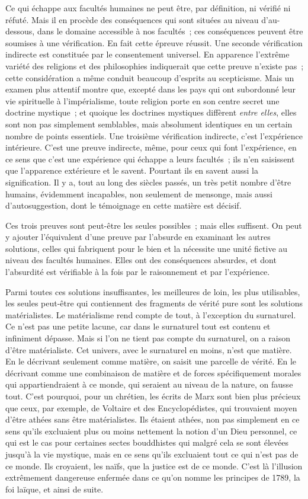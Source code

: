 \documentclass[french,twoside]{book} %
\begin{document}
Ce qui échappe aux facultés humaines ne peut être, par définition, ni vérifié ni réfuté. Mais il en procède des conséquences qui sont situées au niveau d'au-dessous, dans le domaine accessible à nos facultés ; ces conséquences peuvent être soumises à une vérification. En fait cette épreuve réussit. Une seconde vérification indirecte est constituée par le consentement universel. En apparence l'extrême variété des religions et des philosophies indiquerait que cette preuve n'existe pas ; cette considération a même conduit beaucoup d'esprits au scepticisme. Mais un examen plus attentif montre que, excepté dans les pays qui ont subordonné leur vie spirituelle à l'impérialisme, toute religion porte en son centre secret une doctrine mystique ; et quoique les doctrines mystiques diffèrent {\itshape entre elles}, elles sont non pas simplement semblables, mais absolument identiques en un certain nombre de points essentiels. Une troisième vérification indirecte, c'est l'expérience intérieure. C'est une preuve indirecte, même, pour ceux qui font l'expérience, en ce sens que c'est une expérience qui échappe a leurs facultés ; ils n'en saisissent que l'apparence extérieure et le savent. Pourtant ils en savent aussi la signification. Il y a, tout au long des siècles passés, un très petit nombre d'être humains, évidemment incapables, non seulement de mensonge, mais aussi d'autosuggestion, dont le témoignage en cette matière est décisif.\par
Ces trois preuves sont peut-être les seules possibles ; mais elles suffisent. On peut y ajouter l'équivalent d'une preuve par l'absurde en examinant les autres solutions, celles qui fabriquent pour le bien et la nécessite une unité fictive au niveau des facultés humaines. Elles ont des conséquences absurdes, et dont l'absurdité est vérifiable à la fois par le raisonnement et par l'expérience.\par
Parmi toutes ces solutions insuffisantes, les meilleures de loin, les plus utilisables, les seules peut-être qui contiennent des fragments de vérité pure sont les solutions matérialistes. Le matérialisme rend compte de tout, à l'exception du surnaturel. Ce n'est pas une petite lacune, car dans le surnaturel tout est contenu et infiniment dépasse. Mais si l'on ne tient pas compte du surnaturel, on a raison d'être matérialiste. Cet univers, avec le surnaturel en moins, n'est que matière. En le décrivant seulement comme matière, on saisit une parcelle de vérité. En le décrivant comme une combinaison de matière et de forces spécifiquement morales qui appartiendraient à ce monde, qui seraient au niveau de la nature, on fausse tout. C'est pourquoi, pour un chrétien, les écrits de Marx sont bien plus précieux que ceux, par exemple, de Voltaire et des Encyclopédistes, qui trouvaient moyen d'être athées sans être matérialistes. Ils étaient athées, non pas simplement en ce sens qu'ils excluaient plus ou moins nettement la notion d'un Dieu personnel, ce qui est le cas pour certaines sectes bouddhistes qui malgré cela se sont élevées jusqu'à la vie mystique, mais en ce sens qu'ils excluaient tout ce qui n'est pas de ce monde. Ils croyaient, les naïfs, que la justice est de ce monde. C'est là l'illusion extrêmement dangereuse enfermée dans ce qu'on nomme les principes de 1789, la foi laïque, et ainsi de suite.\par
\end{document}
